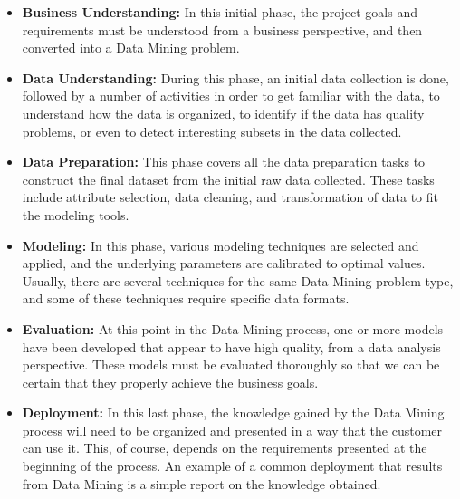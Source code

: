 \begin{itemize}

    \item\textbf{Business Understanding:} In this initial phase, the project goals and requirements must be understood from a business perspective, and then converted into a Data Mining problem.

    \item\textbf{Data Understanding:} During this phase, an initial data collection is done, followed by a number of activities in order to get familiar with the data, to understand how the data is organized, to identify if the data has quality problems, or even to detect interesting subsets in the data collected.

    \item\textbf{Data Preparation:} This phase covers all the data preparation tasks to construct the final dataset from the initial raw data collected. These tasks include attribute selection, data cleaning, and transformation of data to fit the modeling tools.

    \item\textbf{Modeling:} In this phase, various modeling techniques are selected and applied, and the underlying parameters are calibrated to optimal values. Usually, there are several techniques for the same Data Mining problem type, and some of these techniques require specific data formats.

    \item\textbf{Evaluation:} At this point in the Data Mining process, one or more models have been developed that appear to have high quality, from a data analysis perspective. These models must be evaluated thoroughly so that we can be certain that they properly achieve the business goals.

    \item\textbf{Deployment:} In this last phase, the knowledge gained by the Data Mining process will need to be organized and presented in a way that the customer can use it. This, of course, depends on the requirements presented at the beginning of the process. An example of a common deployment that results from Data Mining is a simple report on the knowledge obtained. 

\end{itemize}

